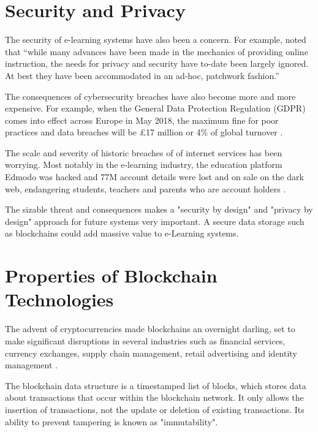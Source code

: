 
\section{Security and Privacy}

The security of e-learning systems have also been a concern. For example, \citet{el2003privacy} noted that “while many
advances have been made in the mechanics of providing online instruction, the needs for privacy and security have to-date
been largely ignored. At best they have been accommodated in an ad-hoc, patchwork fashion.”

The consequences of cybersecurity breaches have also become more and more expensive. For example, when the General Data
Protection Regulation (GDPR) comes into effect across Europe in May 2018, the maximum fine for poor practices and data
breaches will be £17 million or 4\% of global turnover \citep{ico2017gdpr}.

The scale and severity of historic breaches of of internet services has been worrying. Most notably in the e-learning
industry, the education platform Edmodo was hacked and 77M account details were lost and on sale on the dark
web, endangering students, teachers and parents who are account holders \citep{opsecmonkey2017edmodo}.

The sizable threat and consequences makes a "security by design" and "privacy by design" approach for future 
systems very important. A secure data storage such as blockchains could add massive value to e-Learning systems.

\section{Properties of Blockchain Technologies}

The advent of cryptocurrencies made blockchains an overnight darling, set to make significant disruptions
in several industries such as financial services, currency exchanges, supply chain management, retail
advertising and identity management \citep{forbes2017industries}.

The blockchain data structure is a timestamped list of blocks, which stores data about transactions
that occur within the blockchain network. It only allows the insertion of transactions, not the update
or deletion of existing transactions. Its ability to prevent tampering is known as "immutability". \citep[p.182]{xu2016blockchain}

